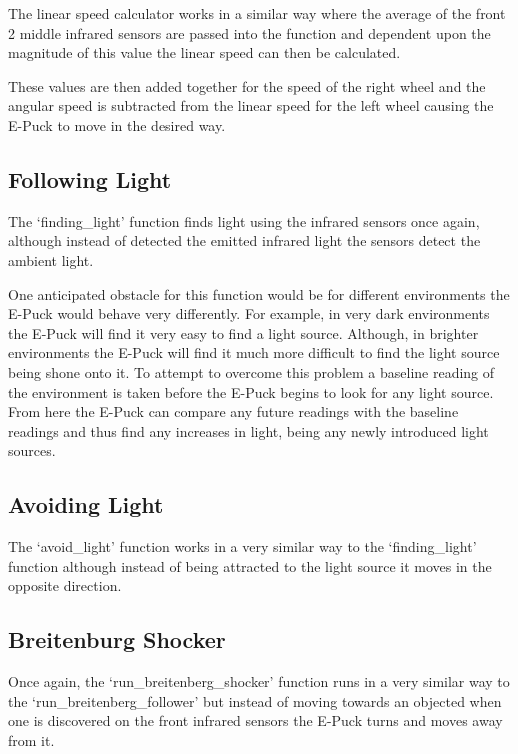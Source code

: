 The linear speed calculator works in a similar way where the average of the front 2 middle infrared sensors are passed into the function and dependent upon the magnitude of this value the linear speed can then be calculated. 

These values are then added together for the speed of the right wheel and the angular speed is subtracted from the linear speed for the left wheel causing the E-Puck to move in the desired way.

\subsection{Following Light}

The `finding\_light' function finds light using the infrared sensors once again, although instead of detected the emitted infrared light the sensors detect the ambient light.

One anticipated obstacle for this function would be for different environments the E-Puck would behave very differently. For example, in very dark environments the E-Puck will find it very easy to find a light source. Although, in brighter environments the E-Puck will find it much more difficult to find the light source being shone onto it. To attempt to overcome this problem a baseline reading of the environment is taken before the E-Puck begins to look for any light source. From here the E-Puck can compare any future readings with the baseline readings and thus find any increases in light, being any newly introduced light sources.

\subsection{Avoiding Light}

The `avoid\_light' function works in a very similar way to the `finding\_light' function although instead of being attracted to the light source it moves in the opposite direction.

\subsection{Breitenburg Shocker}

Once again, the `run\_breitenberg\_shocker' function runs in a very similar way to the `run\_breitenberg\_follower' but instead of moving towards an objected when one is discovered on the front infrared sensors the E-Puck turns and moves away from it.

